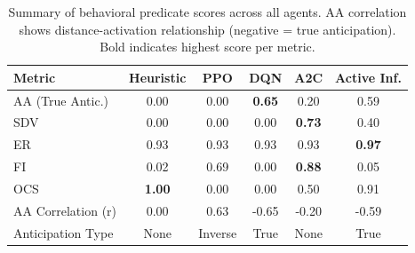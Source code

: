 \begin{table}[t]
\caption{Summary of behavioral predicate scores across all agents. AA correlation shows distance-activation relationship (negative = true anticipation). Bold indicates highest score per metric.}
\label{tab:results}
\centering
\small
\begin{tabular}{lccccc}
\toprule
Metric & Heuristic & PPO & DQN & A2C & Active Inf. \\
\midrule
AA (True Antic.) & 0.00 & 0.00 & \textbf{0.65} & 0.20 & 0.59 \\
SDV & 0.00 & 0.00 & 0.00 & \textbf{0.73} & 0.40 \\
ER & 0.93 & 0.93 & 0.93 & 0.93 & \textbf{0.97} \\
FI & 0.02 & 0.69 & 0.00 & \textbf{0.88} & 0.05 \\
OCS & \textbf{1.00} & 0.00 & 0.00 & 0.50 & 0.91 \\
\midrule
AA Correlation (r) & 0.00 & 0.63 & -0.65 & -0.20 & -0.59 \\
Anticipation Type & None & Inverse & True & None & True \\
\bottomrule
\end{tabular}
\end{table}
